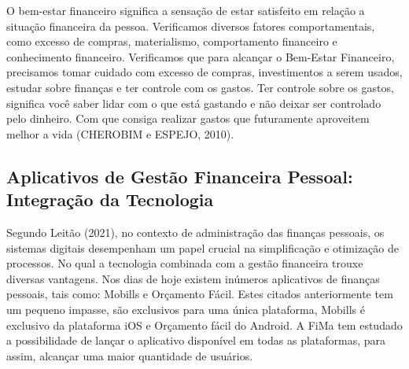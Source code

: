 O bem-estar financeiro significa a sensação de estar satisfeito em relação a situação financeira da pessoa. Verificamos diversos fatores comportamentais, como excesso de compras, materialismo, comportamento financeiro e conhecimento financeiro. Verificamos que para alcançar o Bem-Estar Financeiro, precisamos tomar cuidado com excesso de compras, investimentos a serem usados, estudar sobre finanças e ter controle com os gastos. Ter controle sobre os gastos, significa você saber lidar com o que está gastando e não deixar ser controlado pelo dinheiro. Com que consiga realizar gastos que futuramente aproveitem melhor a vida (CHEROBIM e ESPEJO, 2010).

\subsection{Aplicativos de Gestão Financeira Pessoal: Integração da Tecnologia}
\nocite{leitao}
Segundo Leitão (2021), no contexto de administração das finanças pessoais, os sistemas digitais desempenham um papel crucial na simplificação e otimização de processos. No qual a tecnologia combinada com a gestão financeira trouxe diversas vantagens. Nos dias de hoje existem inúmeros aplicativos de finanças pessoais, tais como: Mobills e Orçamento Fácil. Estes citados anteriormente tem um pequeno impasse, são exclusivos para uma única plataforma, Mobills é exclusivo da plataforma iOS e Orçamento fácil do Android. A FiMa tem estudado a possibilidade de lançar o aplicativo disponível em todas as plataformas, para assim, alcançar uma maior quantidade de usuários.
